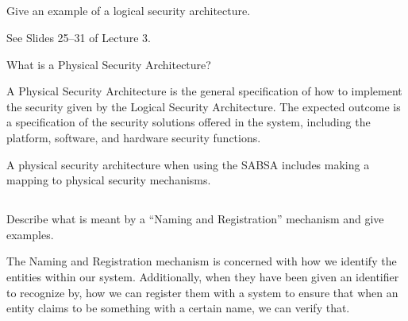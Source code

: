 \begin{questions}
\begin{parts}
  \part{} Give an example of a logical security architecture.
    \begin{solution}
      See Slides 25--31 of Lecture 3.
    \end{solution}
  \end{parts}

\question{} What is a Physical Security Architecture?
  \begin{solution}
    A Physical Security Architecture is the general specification of how to implement the security given by the Logical Security Architecture.
    The expected outcome is a specification of the security solutions offered in the system, including the platform, software, and hardware security functions.
  \end{solution}

\question{} A physical security architecture when using the SABSA includes making a mapping to physical security mechanisms.
  \begin{parts}
  \part{} Describe what is meant by a ``Naming and Registration'' mechanism and give examples.
    \begin{solution}
      The Naming and Registration mechanism is concerned with how we identify the entities within our system.
      Additionally, when they have been given an identifier to recognize by, how we can register them with a system to ensure that when an entity claims to be something with a certain name, we can verify that.


\end{solution}
\end{parts}
\end{questions}
